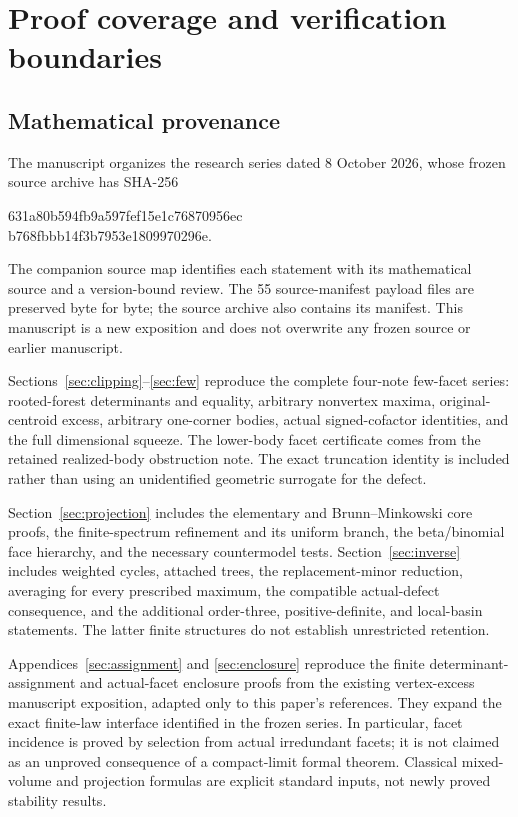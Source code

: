 \section{Proof coverage and verification boundaries}\label{app:review}
\subsection{Mathematical provenance}
The manuscript organizes the research series dated 8 October 2026,
whose frozen source archive has SHA-256
\begin{center}\small\ttfamily
631a80b594fb9a597fef15e1c76870956ec\\b768fbbb14f3b7953e1809970296e.
\end{center}
The companion source map identifies each statement with its mathematical
source and a version-bound review. The 55 source-manifest payload files
are preserved byte for byte; the source archive also contains its manifest.
This manuscript is a new exposition and does not overwrite any frozen
source or earlier manuscript.

Sections~\ref{sec:clipping}--\ref{sec:few} reproduce the complete four-note
few-facet series: rooted-forest determinants and equality, arbitrary
nonvertex maxima, original-centroid excess, arbitrary one-corner bodies,
actual signed-cofactor identities, and the full dimensional squeeze.
The lower-body facet certificate comes from the retained realized-body
obstruction note. The exact truncation identity is included rather than
using an unidentified geometric surrogate for the defect.

Section~\ref{sec:projection} includes the elementary and
Brunn--Minkowski core proofs, the finite-spectrum refinement and its
uniform branch, the beta/binomial face hierarchy, and the necessary
countermodel tests. Section~\ref{sec:inverse} includes weighted cycles,
attached trees, the replacement-minor reduction, averaging for every
prescribed maximum, the compatible actual-defect consequence, and the
additional order-three, positive-definite, and local-basin statements.
The latter finite structures do not establish unrestricted retention.

Appendices~\ref{sec:assignment} and \ref{sec:enclosure} reproduce the
finite determinant-assignment and actual-facet enclosure proofs from the
existing vertex-excess manuscript exposition, adapted only to this
paper's references. They expand the exact finite-law interface identified
in the frozen series. In particular, facet incidence is proved by selection
from actual irredundant facets; it is not claimed as an unproved consequence
of a compact-limit formal theorem. Classical mixed-volume and projection
formulas are explicit standard inputs, not newly proved stability results.

